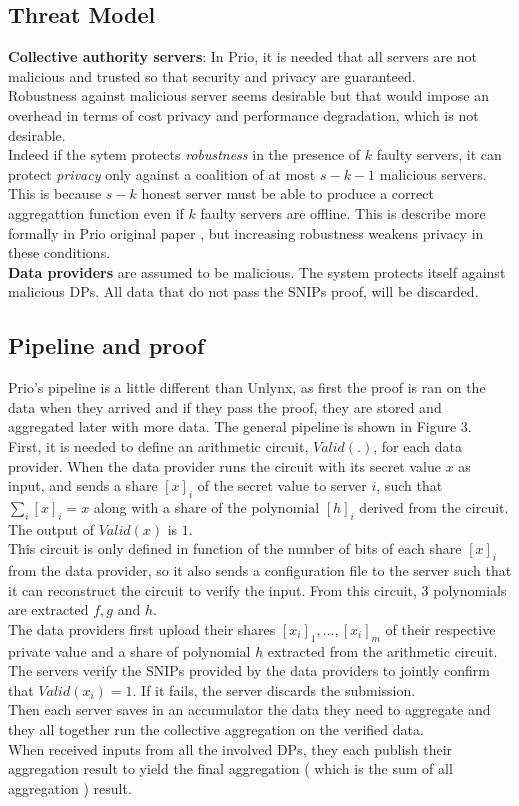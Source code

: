 \documentclass{article}
\begin{document}
\subsection{Threat Model}
\textbf{Collective authority servers}: In Prio, it is needed that all servers are not malicious and trusted so that security and privacy are guaranteed.\\
Robustness against malicious server seems desirable but that would impose an overhead in terms of cost privacy and performance degradation, which is not desirable.\\
Indeed if the sytem protects \textit{robustness} in the presence of $k$ faulty servers, it can protect \textit{privacy} only against a coalition of at most $s-k-1$ malicious servers. This is because $s-k$ honest server must be able to produce a correct aggregattion function even if $k$ faulty servers are offline. This is describe more formally in Prio original paper \cite{prio}, but increasing robustness weakens privacy in these conditions.\\
\textbf{Data providers} are assumed to be malicious. The system protects itself against malicious DPs. All data that do not pass the SNIPs proof, will be discarded.\\

\subsection{Pipeline and proof}
Prio's pipeline is a little different than Unlynx, as first the proof is ran on the data when they arrived and if they pass the proof, they are stored and aggregated later with more data. The general pipeline is shown in Figure 3.\\
First, it is needed to define an arithmetic circuit, $Valid(.)$, for each data provider.
When the data provider runs the circuit with its secret value $x$ as input, and sends a share $[x]_i$ of the secret value to server $i$, such that $\sum_{i}{[x]_i} = x $ along with a share of the polynomial $[h]_i$ derived from the circuit. The output of $Valid(x)$ is $1$.\\ 
This circuit is only defined in function of the number of bits of each share $[x]_i$ from the data provider, so it also sends a configuration file to the server such that it can reconstruct the circuit to verify the input. From this circuit, $3$ polynomials are extracted $f,g $ and $h$.\\

The data providers first upload their shares $[x_i]_1,...,[x_i]_m$ of their respective private value and a share of polynomial $h$ extracted from the arithmetic circuit.\\
The servers verify the SNIPs provided by the data providers to jointly confirm that $Valid(x_i) = 1$. If it fails, the server discards the submission.\\
Then each server saves in an accumulator the data they need to aggregate and they all together run the collective aggregation on the verified data.\\
When received inputs from all the involved DPs, they each publish their aggregation result to yield the final aggregation ( which is the sum of all aggregation ) result.
\end{document}
